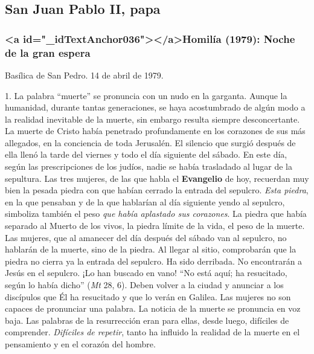 			\subsection{San Juan Pablo II, papa}
			
			\subsubsection{<a id="_idTextAnchor036"></a>Homilía (1979): Noche de la gran espera}
			
			\begin{referencia}Basílica de San Pedro. 14 de abril de 1979.\end{referencia}
			
			\begin{body}1. La palabra “muerte” se pronuncia con un nudo en la garganta. Aunque la humanidad, durante tantas generaciones, se haya acostumbrado de algún modo a la realidad inevitable de la muerte, sin embargo resulta siempre desconcertante. La muerte de Cristo había penetrado profundamente en los corazones de sus más allegados, en la conciencia de toda Jerusalén. El silencio que surgió después de ella llenó la tarde del viernes y todo el día siguiente del sábado. En este día, según las prescripciones de los judíos, nadie se había trasladado al lugar de la sepultura. Las tres mujeres, de las que habla el \textbf{Evangelio} de hoy, recuerdan muy bien la pesada piedra con que habían cerrado la entrada del sepulcro. \textit{Esta piedra}, en la que pensaban y de la que hablarían al día siguiente yendo al sepulcro, simboliza también el peso \textit{que había aplastado sus corazones}. La piedra que había separado al Muerto de los vivos, la piedra límite de la vida, el peso de la muerte. Las mujeres, que al amanecer del día después del sábado van al sepulcro, no hablarán de la muerte, sino de la piedra. Al llegar al sitio, comprobarán que la piedra no cierra ya la entrada del sepulcro. Ha sido derribada. No encontrarán a Jesús en el sepulcro. ¡Lo han buscado en vano! “No está aquí; ha resucitado, según lo había dicho” (\textit{Mt} 28, 6). Deben volver a la ciudad y anunciar a los discípulos que Él ha resucitado y que lo verán en Galilea. Las mujeres no son capaces de pronunciar una palabra. La noticia de la muerte se pronuncia en voz baja. Las palabras de la resurrección eran para ellas, desde luego, difíciles de comprender. \textit{Difíciles de repetir}, tanto ha influido la realidad de la muerte en el pensamiento y en el corazón del hombre.\end{body}
			
